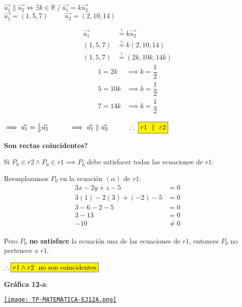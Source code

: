 \begin{center}
	$\vec{u_1} \parallel \vec{u_2} \iff \exists k \in \mathbb{R} \ / \ \vec{u_1} = k\vec{u_2}$ \\
	\vspace{0.3cm}
	$\vec{u_1} = (1, 5, 7) \hspace{1cm} \vec{u_2} = (2, 10, 14)$
\end{center}

\begin{multicols}{2}
	\begin{align*}
		\vec{u_1} & \overset{?}{=} k\vec{u_2}     \\
		(1, 5, 7) & \overset{?}{=} k(2, 10, 14)   \\
		(1, 5, 7) & \overset{?}{=} (2k, 10k, 14k)
	\end{align*}
	\columnbreak
	\begin{align*}
		1 = 2k  & \implies k = \dfrac{1}{2} \\
		5 = 10k & \implies k = \dfrac{1}{2} \\
		7 = 14k & \implies k = \dfrac{1}{2}
	\end{align*}
\end{multicols}
\begin{center}
	$\implies \vec{u_1} = \frac{1}{2}\vec{u_2} \hspace{1cm} \implies \vec{u_1} \parallel \vec{u_2} \hspace{1cm} \therefore \ \fcolorbox{black}{yellow}{$r1 \ \parallel \ r2$}$
\end{center}

\vspace{1cm}
\noindent \textbf{Son rectas coincidentes?}

\noindent Si $P_0 \in r2 \land P_0 \in r1 \implies P_0$ debe satisfacer todas las ecuaciones de $r1$:

\noindent Reemplazamos $P_0$ en la ecuación $(\alpha)$ de $r1$:
\begin{align*}
	3x - 2y + z - 5        & = 0    \\
	3(1) - 2(3) + (-2) - 5 & = 0    \\
	3 - 6 -2 - 5           & = 0    \\
	3 - 13                 & = 0    \\
	-10                    & \neq 0
\end{align*}

\noindent Pero $P_0$ \textbf{no satisface} la ecuación una de las ecuaciones de $r1$, entonces $P_0$ no pertenece a $r1$.
\begin{center}
	$\therefore \fcolorbox{black}{yellow}{$r1 \land r2 \ \ \text{no son coincidentes}$}$
\end{center}

\vspace{1cm}
\noindent \textbf{Gráfica 12-a}:
\begin{center}
	\href{https://www.geogebra.org/3d/yqkppcut}{\texttt{[image: TP-MATEMÁTICA-EJ12A.png]}}
\end{center}


